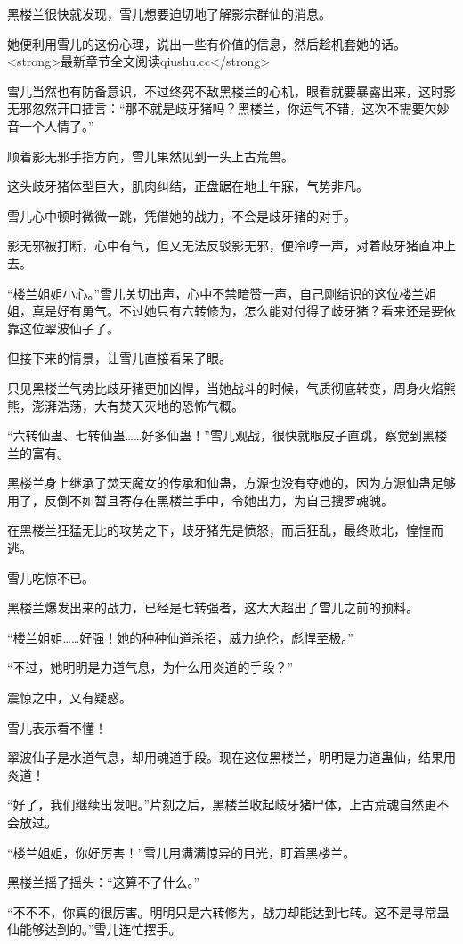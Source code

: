 \begin{this_body}
黑楼兰很快就发现，雪儿想要迫切地了解影宗群仙的消息。

她便利用雪儿的这份心理，说出一些有价值的信息，然后趁机套她的话。<strong>最新章节全文阅读qiushu.cc</strong>

雪儿当然也有防备意识，不过终究不敌黑楼兰的心机，眼看就要暴露出来，这时影无邪忽然开口插言：“那不就是歧牙猪吗？黑楼兰，你运气不错，这次不需要欠妙音一个人情了。”

顺着影无邪手指方向，雪儿果然见到一头上古荒兽。

这头歧牙猪体型巨大，肌肉纠结，正盘踞在地上午寐，气势非凡。

雪儿心中顿时微微一跳，凭借她的战力，不会是歧牙猪的对手。

影无邪被打断，心中有气，但又无法反驳影无邪，便冷哼一声，对着歧牙猪直冲上去。

“楼兰姐姐小心。”雪儿关切出声，心中不禁暗赞一声，自己刚结识的这位楼兰姐姐，真是好有勇气。不过她只有六转修为，怎么能对付得了歧牙猪？看来还是要依靠这位翠波仙子了。

但接下来的情景，让雪儿直接看呆了眼。

只见黑楼兰气势比歧牙猪更加凶悍，当她战斗的时候，气质彻底转变，周身火焰熊熊，澎湃浩荡，大有焚天灭地的恐怖气概。

“六转仙蛊、七转仙蛊……好多仙蛊！”雪儿观战，很快就眼皮子直跳，察觉到黑楼兰的富有。

黑楼兰身上继承了焚天魔女的传承和仙蛊，方源也没有夺她的，因为方源仙蛊足够用了，反倒不如暂且寄存在黑楼兰手中，令她出力，为自己搜罗魂魄。

在黑楼兰狂猛无比的攻势之下，歧牙猪先是愤怒，而后狂乱，最终败北，惶惶而逃。

雪儿吃惊不已。

黑楼兰爆发出来的战力，已经是七转强者，这大大超出了雪儿之前的预料。

“楼兰姐姐……好强！她的种种仙道杀招，威力绝伦，彪悍至极。”

“不过，她明明是力道气息，为什么用炎道的手段？”

震惊之中，又有疑惑。

雪儿表示看不懂！

翠波仙子是水道气息，却用魂道手段。现在这位黑楼兰，明明是力道蛊仙，结果用炎道！

“好了，我们继续出发吧。”片刻之后，黑楼兰收起歧牙猪尸体，上古荒魂自然更不会放过。

“楼兰姐姐，你好厉害！”雪儿用满满惊异的目光，盯着黑楼兰。

黑楼兰摇了摇头：“这算不了什么。”

“不不不，你真的很厉害。明明只是六转修为，战力却能达到七转。这不是寻常蛊仙能够达到的。”雪儿连忙摆手。


\end{this_body}
